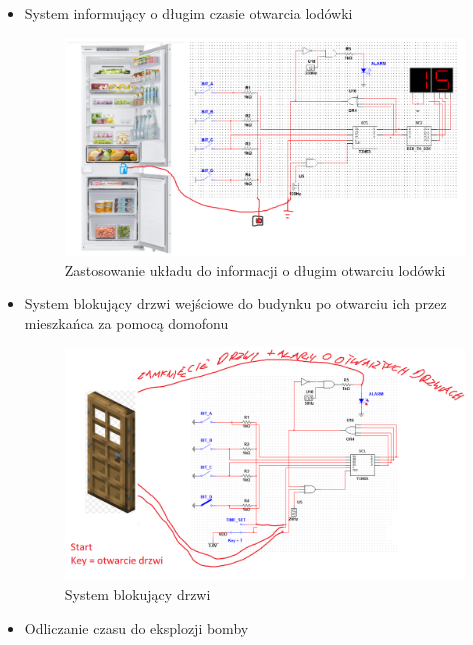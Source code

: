 \documentclass{article}
\begin{document}
    \begin{itemize}
        \item System informujący o długim czasie otwarcia lodówki \begin{figure}[H]
            \centering
            \captionsetup{font=small, skip=2pt}
            \includegraphics[scale=0.7]{images/lodowka}
            \caption{Zastosowanie układu do informacji o długim otwarciu lodówki}
        \end{figure}
        \item System blokujący drzwi wejściowe do budynku po otwarciu ich przez mieszkańca za pomocą domofonu
        \begin{figure}[H]
            \centering
            \captionsetup{font=small, skip=2pt}
            \includegraphics[scale=0.3]{images/drzwi}
            \caption{System blokujący drzwi}
        \end{figure}
        \item Odliczanie czasu do eksplozji bomby \begin{figure}[H]
            \centering
            \captionsetup{font=small, skip=2pt}

\end{figure}
\end{itemize}
\end{document}
